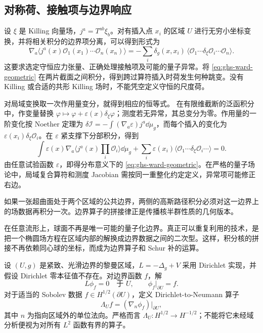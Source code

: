 \subsection{对称荷、接触项与边界响应}

设 $\xi$ 是 Killing 向量场，$j^a=T^{ab}\xi_b$。对有插入点 $x_i$ 的区域 $U$ 进行无穷小坐标变换，并将相关积分的边界项分离，可以得到形式为
\begin{equation}\label{eq:ghs-ward-geometric}
 \nabla_a\langle j^a(x)\mathcal O_1(x_1)\cdots\mathcal O_n(x_n)\rangle
 =-\sum_i\delta_g(x,x_i)\,
 \langle\mathcal O_1\cdots\delta_\xi\mathcal O_i\cdots\mathcal O_n\rangle.
\end{equation}
这要求选定守恒应力张量、正确处理接触项及可能的量子异常。将 \cref{eq:ghs-ward-geometric} 在两片截面之间积分，得到跨过算符插入时荷发生何种跳变。没有 Killing 或合适的共形 Killing 场时，不能凭空定义守恒的尺度荷。


对局域变换取一次作用量变分，就得到相应的恒等式。
在有限维截断的泛函积分中，作变量替换 $\varphi\mapsto\varphi+\varepsilon(x)\delta_\xi\varphi$；测度若无异常，其总变分为零。作用量的一阶变化按 Noether 定理为 $\delta\mathscr I=-\int(\nabla_a\varepsilon)j^a\dd\mu_g$，而每个插入的变化为 $\varepsilon(x_i)\delta_\xi\mathcal O_i$。在 $\varepsilon$ 紧支撑下分部积分，得到
\[
 \int\varepsilon(x)\nabla_a\langle j^a(x)\prod_i\mathcal O_i\rangle\dd\mu_g
 +\sum_i\varepsilon(x_i)\langle\mathcal O_1\cdots\delta_\xi\mathcal O_i\cdots\rangle=0.
\]
由任意试验函数 $\varepsilon$，即得分布意义下的 \cref{eq:ghs-ward-geometric}。在严格的量子场论中，局域复合算符和测度 Jacobian 需按同一重整化约定定义，异常项可能修正右边。




如果一张超曲面处于两个区域的公共边界，两侧的高斯路径积分必须对这一边界上的场数据再积分一次。边界算子的拼接律正是传播核半群性质的几何版本。




在任意流形上，球面不再是唯一可能的量子化边界。真正可以重复利用的技术，是把一个椭圆场方程在区域内部的解换成边界数据之间的二次型。这样，积分核的拼接不再依赖同心球的坐标，而成为边界算子和 Schur 补的运算。


设 $(U,g)$ 是紧致、光滑边界的黎曼区域，$L=-\Delta_g+V$ 采用 Dirichlet 实现，并假设 Dirichlet 零本征值不存在。对边界函数 $f$，解
\[
 L\phi_f=0\quad\text{于 }U,\qquad \phi_f|_{\partial U}=f.
\]
对于适当的 Sobolev 数据 $f\in H^{1/2}(\partial U)$，定义 Dirichlet-to-Neumann 算子
\begin{equation}\label{eq:ghs-dn-definition}
 \Lambda_U f=(\nabla_n\phi_f)|_{\partial U},
\end{equation}
其中 $n$ 为指向区域外的单位法向。严格而言 $\Lambda_U:H^{1/2}\to H^{-1/2}$；不能将它未经域分析便视为对所有 $L^2$ 函数有界的算子。


